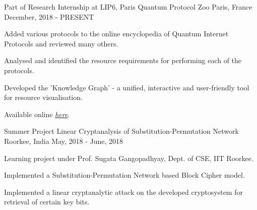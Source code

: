 

\begin{cventries}

  \cventry
    {Part of Research Internship at LIP6, Paris} %
    {Quantum Protocol Zoo} %
    {Paris, France} %
    {December, 2018 - PRESENT} %
    {
      \begin{cvitems} %
        \item {Added various protocols to the online encyclopedia of Quantum Internet Protocols and reviewed many others.}
        \item {Analysed and identified the resource requirements for performing each of the protocols.}
        \item {Developed the 'Knowledge Graph' - a unified, interactive and user-friendly tool for resource visualisation.}
        \item {Available online \emph{\href{https://quantumprotocolzoo.github.io/}{here}}.}
      \end{cvitems}
    }

  \cventry
    {Summer Project} %
    {Linear Cryptanalysis of Substitution-Permutation Network} %
    {Roorkee, India} %
    {May, 2018 - June, 2018} %
    {
      \begin{cvitems} %
        \item {Learning project under Prof. Sugata Gangopadhyay, Dept. of CSE, IIT Roorkee.}
        \item {Implemented a Substitution-Permutation Network based Block Cipher model.}
        \item {Implemented a linear cryptanalytic attack on the developed cryptosystem for retrieval of certain key bits.}
      \end{cvitems}
    }


\end{cventries}
